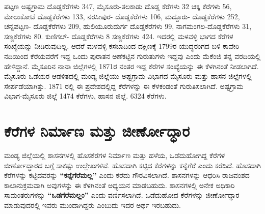 ಪಟ್ಟಣ ಅಷ್ಟಗ್ರಾಮ  ದೊಡ್ಡಕೆರೆಗಳು 347, ಮೈಸೂರು-ತಲಕಾಡು ದೊಡ್ಡ ಕೆರೆಗಳು 32 ಚಿಕ್ಕ ಕೆರೆಗಳು 56, ಮೇಲುಕೋಟೆ  ದೊಡ್ಡಕೆರೆಗಳು 133, ನರಸೀಪುರ- ದೊಡ್ಡಕೆರೆಗಳು 106, ಮದ್ದೂರು- ದೊಡ್ಡಕೆರೆಗಳು 252, \hbox{ಚನ್ನಪಟ್ಟಣ-} ದೊಡ್ಡಕೆರೆಗಳು 209, ಹುಲಿಯೂರುದುರ್ಗ ದೊಡ್ಡಕೆರೆಗಳು 99, ನಾಗಮಂಗಲ-ದೊಡ್ಡಕೆರೆಗಳು 31, ಸಣ್ಣಕೆರೆಗಳು 80. ಕುಣಿಗಲ್​- ದೊಡ್ಡಕೆರೆಗಳು 8 ಸಣ್ಣಕೆರೆಗಳು 424. ಇದರಲ್ಲಿ ಮಳವಳ್ಳಿ ಭಾಗದ ಕೆರೆಗಳ ಸಂಖ್ಯೆಯನ್ನು ನೀಡಿರುವುದಿಲ್ಲ. ಆದರೆ ಮಳವಳ್ಳಿ ಕಸಬಾದಿಂದ ದಕ್ಷಿಣಕ್ಕೆ 1799ರ ಯುದ್ಧರಂಗದ ಬಳಿ ಕಾವೇರಿ ನದಿಯಿಂದ ಕೆರೆಯವರೆಗೆ ಇದ್ದ ಒಂದು ಪುರಾತನ ಅಣೆಕಟ್ಟಿನ ಗುರುತುಗಳು ಇದ್ದವು ಎಂದು ಮೆಕೆಂಜಿ ತನ್ನ ವರದಿಯಲ್ಲಿ ಹೇಳಿದ್ದಾನೆ. ಮೈಸೂರಿನ ನಾನಾ ಜಿಲ್ಲೆಗಳಲ್ಲಿ 1871ರ ನಂತರ ಇದ್ದ ಕೆರೆಗಳ ಸಂಖ್ಯೆಯನ್ನು ಈ ಕೆಳಗಿನಂತೆ ನೀಡಲಾಗಿದೆ. ಮೈಸೂರು ಒಡೆಯರ ಆಡಳಿತದಲ್ಲಿ ಮಂಡ್ಯ ಜಿಲ್ಲೆಯು ಅಷ್ಟಗ್ರಾಮ ವಿಭಾಗದ ಮೈಸೂರು ಮತ್ತು ಹಾಸನ ಜಿಲ್ಲೆಗಳಲ್ಲಿ ಸೇರ್ಪಡೆಯಾಗಿತ್ತು. 1871 ರಲ್ಲಿ ಈ ಪ್ರದೇಶದಲ್ಲಿದ್ದ ಕೆರೆಗಳನ್ನು ಈ ಕೆಳಕಂಡಂತೆ ಗುರುತಿಸಲಾಗಿದೆ. ಅಷ್ಟಗ್ರಾಮ ವಿಭಾಗ-ಮೈಸೂರು ಜಿಲ್ಲೆ 1474 ಕೆರೆಗಳು, ಹಾಸನ ಜಿಲ್ಲೆ. 6324 ಕೆರೆಗಳು.


\section*{ಕೆರೆಗಳ ನಿರ್ಮಾಣ ಮತ್ತು ಜೀರ್ಣೋದ್ಧಾರ}

ಮಂಡ್ಯ ಜಿಲ್ಲೆಯಲ್ಲಿ ಶಾಸನಗಳಲ್ಲಿ ಹೊಸಕೆರೆಗಳ ನಿರ್ಮಾಣ ಮತ್ತು ಹಳೆಯ, ಒಡೆದುಹೋಗಿದ್ದ ಕೆರೆಗಳ ಜೀರ್ಣೋದ್ಧಾರದ ಬಗ್ಗೆ ಸಾಕಷ್ಟು ಉಲ್ಲೇಖಗಳಿವೆ. ಹೊಸದಾಗಿ ಕಟ್ಟಿದ ಕೆರೆಗಳನ್ನು ಕನ್ನೆಗೆರೆ ಎಂದು ಕರೆದಿದೆ. ಹೊಸದಾಗಿ ಕೆರೆಗಳನ್ನು ಕಟ್ಟಿದವರನ್ನು \textbf{“ಕನ್ನೆಗೆರೆಮಲ್ಲ”} ಎಂದು ಕರೆದು ಗೌರವಿಸಲಾಗಿದೆ. ಶಾಸನಗಳನ್ನು ಆಧರಿಸಿ ರಾಜವಂಶದ ಕಾಲಾನುಕ್ರಮವಾಗಿ ಅವುಗಳನ್ನು ಈ ಕೆಳಗಿನಂತೆ ಅಧ್ಯಯನ ಮಾಡಬಹುದು. ಶಾಸನಗಳಲ್ಲಿ ಅನೇಕ ಅಧಿಕಾರಿ ಸಾಮಂತರುಗಳನ್ನು \textbf{“ಒಡಗೆರೆಮಲ್ಲಂ”} ಎಂದು ವರ್ಣಿಸಲಾಗಿದೆ. ಒಡೆದುಹೋದ ಕೆರೆಗಳನ್ನು ಜೀರ್ಣೋದ್ಧಾರ ಮಾಡುವುದರಲ್ಲಿ ಇವರು ಮುಂದಾಗಿದ್ದರು ಎಂಬುದು ಇದರ ಅರ್ಥ ಇರಬಹುದು.

